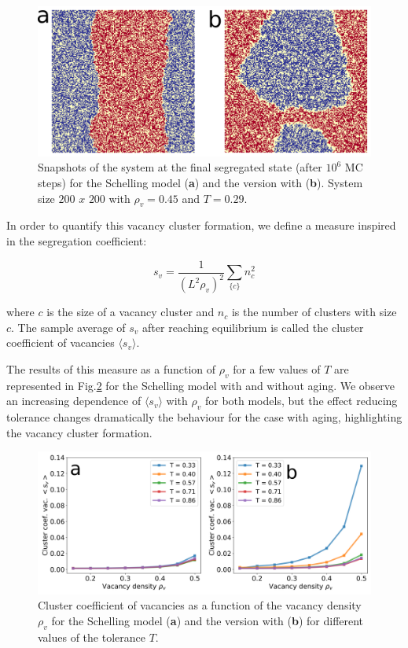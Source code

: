 \begin{figure}
\centering
\includegraphics[width=0.7\linewidth]{Figs/Appendix_Schelling/Fig2_S3.png} 
\caption[Snapshots of the system with large $\rho_{v}$]{Snapshots of the system at the final segregated state (after $10^{6}$ MC steps) for the Schelling model (\textbf{a}) and the version with (\textbf{b}). System size $200$ $x$ $200$ with $\rho_{v} = 0.45$ and $T = 0.29$.}
\label{FigS2}
\end{figure}

In order to quantify this vacancy cluster formation, we define a measure inspired in the segregation coefficient:

\begin{equation}
    s_v = \frac{1}{\left(L^{2}\rho_v\right)^{2}} \sum_{\{c\}} n_{c}^{2}
\end{equation}

where $c$ is the size of a vacancy cluster and ${n_c}$ is the number of clusters with size $c$. The sample average of $s_{v}$ after reaching equilibrium is called the cluster coefficient of vacancies $\langle s_{v} \rangle$. 

The results of this measure as a function of $\rho_v$ for a few values of $T$ are represented in Fig.\ref{FigS3} for the Schelling model with and without aging. We observe an increasing dependence of $\langle s_v \rangle$ with $\rho_v$ for both models, but the effect reducing tolerance changes dramatically the behaviour for the case with aging, highlighting the vacancy cluster formation.


\begin{figure}[h]
\centering
\includegraphics[width=0.75\linewidth]{Figs/Appendix_Schelling/FigS2_3.png} 
\caption[Cluster coefficient of vacancies as a function of the vacancy density]{Cluster coefficient of vacancies as a function of the vacancy density $\rho_v$ for the Schelling model (\textbf{a}) and the version with (\textbf{b}) for different values of the tolerance $T$.}
\label{FigS3}
\end{figure}